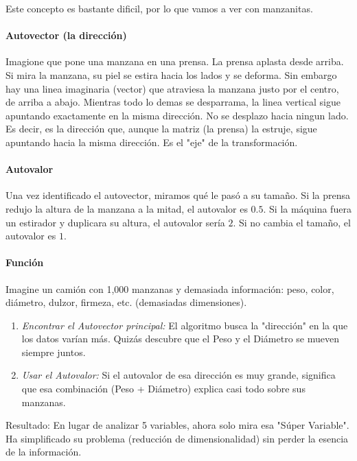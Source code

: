 Este concepto es bastante dificil, por lo que vamos a ver con manzanitas.

\paragraph{Autovector (la dirección)}

Imagione que pone una manzana en una prensa. La prensa aplasta desde arriba. Si mira la manzana, su piel se estira hacia los lados y se deforma. Sin embargo hay una linea imaginaria (vector) que atraviesa la manzana justo por el centro, de arriba a abajo. Mientras todo lo demas se desparrama, la linea vertical sigue apuntando exactamente en la misma dirección. No se desplazo hacia ningun lado. Es decir, es la dirección que, aunque la matriz (la prensa) la estruje, sigue apuntando hacia la misma dirección. Es el "eje" de la transformación.

\paragraph{Autovalor}

Una vez identificado el autovector, miramos qué le pasó a su tamaño. Si la prensa redujo la altura de la manzana a la mitad, el autovalor es \(0.5\). Si la máquina fuera un estirador y duplicara su altura, el autovalor sería \(2\). Si no cambia el tamaño, el autovalor es \(1\).

\paragraph{Función}

Imagine un camión con 1,000 manzanas y demasiada información: peso, color, diámetro, dulzor, firmeza, etc. (demasiadas dimensiones).

\begin{enumerate}
\item \textit{Encontrar el Autovector principal:} El algoritmo busca la "dirección" en la que los datos varían más. Quizás descubre que el Peso y el Diámetro se mueven siempre juntos.
\item \textit{Usar el Autovalor:} Si el autovalor de esa dirección es muy grande, significa que esa combinación (Peso + Diámetro) explica casi todo sobre sus manzanas.
\end{enumerate}

Resultado: En lugar de analizar 5 variables, ahora solo mira esa "Súper Variable". Ha simplificado su problema (reducción de dimensionalidad) sin perder la esencia de la información.

